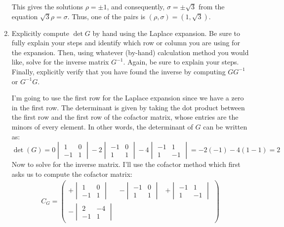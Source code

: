 \documentclass[10pt]{article}
\begin{document}
\begin{enumerate}[label=\alph*)]
\begin{solution}
\[				\] 
				This gives the solutions $\rho = \pm 1$, and consequently, $\sigma = \pm \sqrt{3}$ from the 
				equation $\sqrt{3} \rho = \sigma$. Thus, one of the pairs is $(\rho, \sigma) = (1, \sqrt{3})$. 
			\end{solution}
		\item Explicitly compute $\det G$ by hand using the Laplace expansion. Be sure to fully explain 
			your steps and identify which row or column you are using for the expansion. Then, using whatever
			(by-hand) calculation method you would like, solve for the inverse matrix $G^{-1}$. Again, be sure 
			to explain your steps. Finally, explicitly verify that you have found the inverse by computing 
			$GG^{-1}$ or $G^{-1}G$.

			\begin{solution}
				I'm going to use the first row for the Laplace expansion since we have a zero in the first 
				row. The determinant is given by taking the dot product between the first row and the first 
				row of the cofactor matrix, whose entries are the minors of every element. In other words, 
				the determinant of $G$ can be written as:
				\[
					\det(G) = 0\begin{vmatrix} 1 & 0 \\ -1 & 1\end{vmatrix} - 2 \begin{vmatrix} -1 & 0 \\ 1&1\end{vmatrix} - 4 \begin{vmatrix}-1&1\\1&-1\end{vmatrix} = -2(-1) - 4(1 - 1) = 2
				\] 
				Now to solve for the inverse matrix. I'll use the cofactor method which first asks us to compute
				the cofactor matrix:
				\begin{align*}
					C_G = \begin{pmatrix}+ \begin{vmatrix} 1 & 0 \\ -1 & 1 \end{vmatrix} &
					-\begin{vmatrix} -1 & 0 \\ 1 & 1\end{vmatrix} &
					+\begin{vmatrix} -1&1\\1&-1\end{vmatrix}\\
					-\begin{vmatrix} 2 & -4\\ -1&1\end{vmatrix} &

\end{pmatrix}
\end{align*}
\end{solution}
\end{enumerate}
\end{document}
